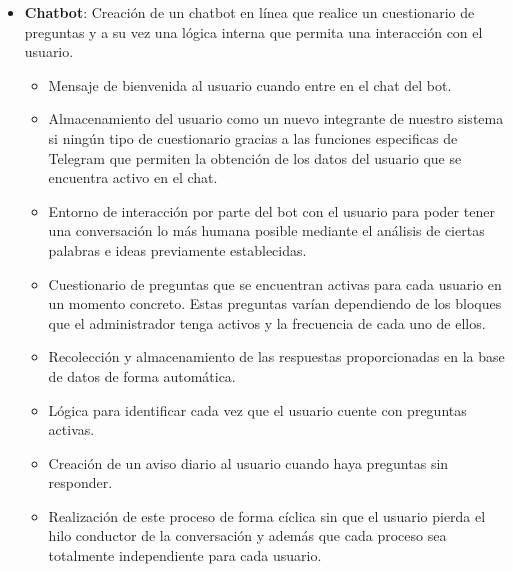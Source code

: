 \begin{itemize}
\begin{itemize}
\end{itemize}
\item \textbf{Chatbot}: Creación de un chatbot en línea que realice un cuestionario de preguntas y a su vez una lógica interna que permita una interacción con el usuario.
\begin{itemize}
\item Mensaje de bienvenida al usuario cuando entre en el chat del bot.
\item Almacenamiento del usuario como un nuevo integrante de nuestro sistema si ningún tipo de cuestionario gracias a las funciones especificas de Telegram que permiten la obtención de los datos del usuario que se encuentra activo en el chat.
\item Entorno de interacción por parte del bot con el usuario para poder tener una conversación lo más humana posible mediante el análisis de ciertas palabras e ideas previamente establecidas.
\item Cuestionario de preguntas que se encuentran activas para cada usuario en un momento concreto. Estas preguntas varían dependiendo de los bloques que el administrador tenga activos y la frecuencia de cada uno de ellos.
\item Recolección y almacenamiento de las respuestas proporcionadas en la base de datos de forma automática.
\item Lógica para identificar cada vez que el usuario cuente con preguntas activas.
\item Creación de un aviso diario al usuario cuando haya preguntas sin responder.
\item Realización de este proceso de forma cíclica sin que el usuario pierda el hilo conductor de la conversación y además que cada proceso sea totalmente independiente para cada usuario.
\end{itemize}
\end{itemize}

